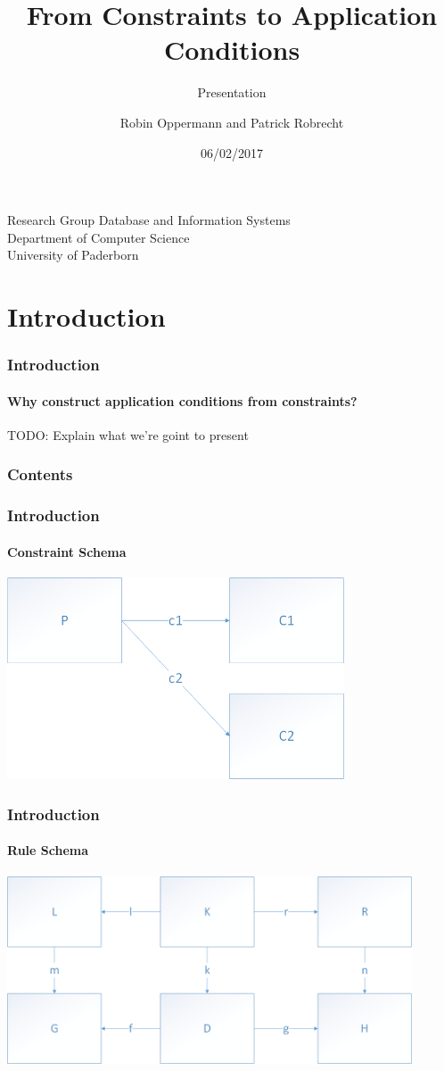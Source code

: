 \documentclass[32pt,t]{beamer}
\begin{document}
	\title{From Constraints to Application Conditions}
	\subtitle{Presentation}
	\date{06/02/2017}
	\author{Robin Oppermann and Patrick Robrecht}
	
	\begin{frame}
		\titlepage
		
		\begin{center}
			Research Group
			Database and Information Systems \\
			Department of Computer Science \\
			University of Paderborn
		\end{center}
	\end{frame}

\section{Introduction}
	\begin{frame}
		\frametitle{Introduction}
		\framesubtitle{Why construct application conditions from constraints?}
		TODO: Explain what we're goint to present
	\end{frame}

	\begin{frame}
		\frametitle{Contents}
		\tableofcontents[currentsection]
	\end{frame}

	\begin{frame}
		\frametitle{Introduction}
		\framesubtitle{Constraint Schema}
		\centering
		\includegraphics[width=10cm]{Images/00_Constraint_Schema}
	\end{frame}
	
	\begin{frame}
		\frametitle{Introduction}
		\framesubtitle{Rule Schema}
		\centering
		\includegraphics[width=12cm]{Images/00_Rule_Schema}
	\end{frame}
\end{document}
